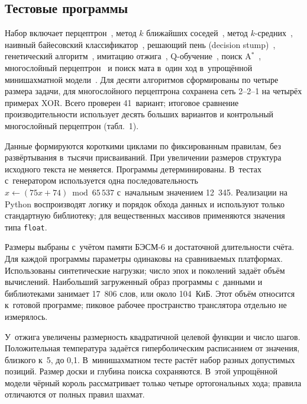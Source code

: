 \documentclass[a4paper,12pt]{article}
\begin{document}
\subsection{Тестовые программы}

Набор включает перцептрон~\cite{rosenblatt}, метод $k$ ближайших соседей~\cite{cover}, метод $k$-средних~\cite{lloyd}, наивный байесовский классификатор~\cite{domingos}, решающий пень (decision stump)~\cite{holte}, генетический алгоритм~\cite{holland}, имитацию отжига~\cite{kirkpatrick}, Q-обучение~\cite{watkins}, поиск A$^*$~\cite{hart}, многослойный перцептрон~\cite{rumelhart} и поиск мата в~один ход в~упрощённой минишахматной модели~\cite{shannon}. Для десяти алгоритмов сформированы по четыре размера задачи, для многослойного перцептрона сохранена сеть 2--2--1 на четырёх примерах XOR. Всего проверен 41~вариант; итоговое сравнение производительности использует десять больших вариантов и контрольный многослойный перцептрон (табл.~1).

Данные формируются короткими циклами по фиксированным правилам, без развёртывания в~тысячи присваиваний. При увеличении размеров структура исходного текста не меняется. Программы детерминированы. В~тестах с~генератором используется одна последовательность $x \leftarrow (75x + 74) \bmod 65\,537$ с~начальным значением 12~345. Реализации на Python воспроизводят логику и порядок обхода данных и используют только стандартную библиотеку; для вещественных массивов применяются значения типа \texttt{float}.

Размеры выбраны с~учётом памяти БЭСМ-6 и достаточной длительности счёта. Для каждой программы параметры одинаковы на сравниваемых платформах. Использованы синтетические нагрузки; число эпох и поколений задаёт объём вычислений. Наибольший загруженный образ программы с~данными и библиотеками занимает 17~806 слов, или около 104~КиБ. Этот объём относится к~готовой программе; пиковое рабочее пространство транслятора отдельно не измерялось.

У~отжига увеличены размерность квадратичной целевой функции и число шагов. Положительная температура задаётся гиперболическим расписанием от значения, близкого к~5, до 0,1. В~минишахматном тесте растёт набор разных допустимых позиций. Размер доски и глубина поиска сохраняются. В~этой упрощённой модели чёрный король рассматривает только четыре ортогональных хода; правила отличаются от полных правил шахмат.
\end{document}

